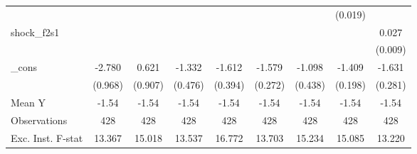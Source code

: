 {\begin{tabular}{l*{8}{c}}
            &                     &                     &                     &                     &                     &                     &     (0.019)         &                     \\
\addlinespace
shock\_f2s1  &                     &                     &                     &                     &                     &                     &                     &       0.027\sym{***}\\
            &                     &                     &                     &                     &                     &                     &                     &     (0.009)         \\
\addlinespace
\_cons      &      -2.780\sym{***}&       0.621         &      -1.332\sym{**} &      -1.612\sym{***}&      -1.579\sym{***}&      -1.098\sym{**} &      -1.409\sym{***}&      -1.631\sym{***}\\
            &     (0.968)         &     (0.907)         &     (0.476)         &     (0.394)         &     (0.272)         &     (0.438)         &     (0.198)         &     (0.281)         \\
\midrule
Mean Y      &       -1.54         &       -1.54         &       -1.54         &       -1.54         &       -1.54         &       -1.54         &       -1.54         &       -1.54         \\
Observations&         428         &         428         &         428         &         428         &         428         &         428         &         428         &         428         \\
Exc. Inst. F-stat&      13.367         &      15.018         &      13.537         &      16.772         &      13.703         &      15.234         &      15.085         &      13.220         \\
\bottomrule
\end{tabular}
}
